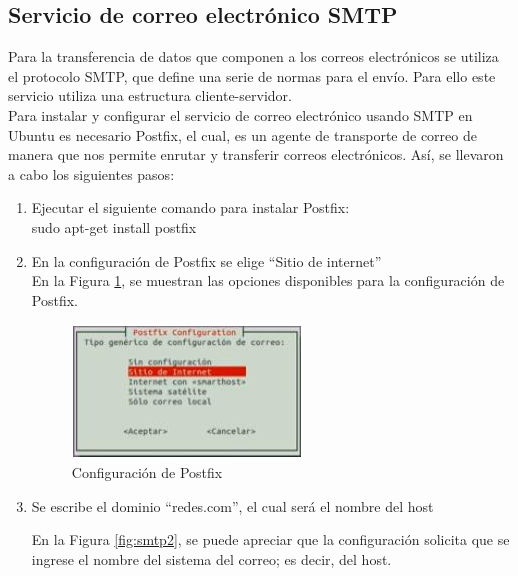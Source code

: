 \subsection{Servicio de correo electrónico SMTP}
\noindent
Para la transferencia de datos que componen a los correos electrónicos se utiliza el protocolo SMTP, que define una serie de normas para el envío. Para ello este servicio utiliza una estructura cliente-servidor.\\

\noindent
Para instalar y configurar el servicio de correo electrónico usando SMTP en Ubuntu es necesario Postfix, el cual, es un agente de transporte de correo de manera que nos permite enrutar y
transferir correos electrónicos. Así, se llevaron a cabo los siguientes pasos:

\begin{enumerate}
    \item Ejecutar el siguiente comando para instalar Postfix:\\
    
    sudo apt-get install postfix\\
    
    \item En la configuración de Postfix se elige “Sitio de internet”\\
    
    En la Figura \ref{fig:smtp1}, se muestran las opciones disponibles para la configuración de Postfix.
    
    \begin{figure}[H]
        \centering
        \includegraphics[scale=1.5]{imagenes/primero/paso2_smtp.PNG}
        \caption{Configuración de Postfix}
        \label{fig:smtp1}
    \end{figure}
    
    \item Se escribe el dominio “redes.com”, el cual será el nombre del host
    
    \noindent
    En la Figura \ref{fig:smtp2}, se puede apreciar que la configuración solicita que se ingrese el nombre del sistema del correo; es decir, del host.
    

\end{enumerate}
